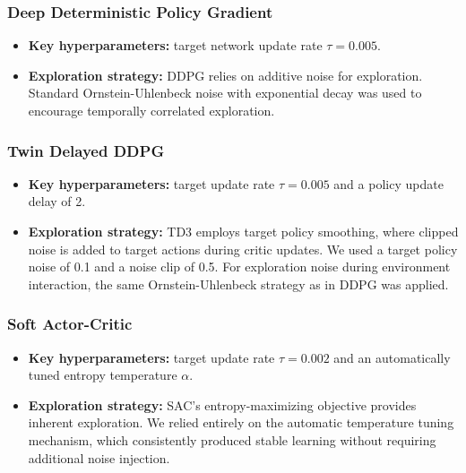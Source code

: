 \documentclass[]{interact}
\begin{document}
\subsubsection{Deep Deterministic Policy Gradient}

\begin{itemize}

    \item \textbf{Key hyperparameters:} target network update rate $\tau = 0.005$.
    \item \textbf{Exploration strategy:} DDPG relies on additive noise for exploration. Standard Ornstein-Uhlenbeck noise with exponential decay was used to encourage temporally correlated exploration.
\end{itemize}

\subsubsection{Twin Delayed DDPG}

\begin{itemize}

    \item \textbf{Key hyperparameters:} target update rate $\tau = 0.005$ and a policy update delay of 2.
    \item \textbf{Exploration strategy:} TD3 employs target policy smoothing, where clipped noise is added to target actions during critic updates. We used a target policy noise of 0.1 and a noise clip of 0.5. For exploration noise during environment interaction, the same Ornstein-Uhlenbeck strategy as in DDPG was applied.
\end{itemize}

\subsubsection{Soft Actor-Critic}

\begin{itemize}

    \item \textbf{Key hyperparameters:} target update rate $\tau = 0.002$ and an automatically tuned entropy temperature $\alpha$.
    \item \textbf{Exploration strategy:} SAC’s entropy-maximizing objective provides inherent exploration. We relied entirely on the automatic temperature tuning mechanism, which consistently produced stable learning without requiring additional noise injection.
\end{itemize}
\end{document}
